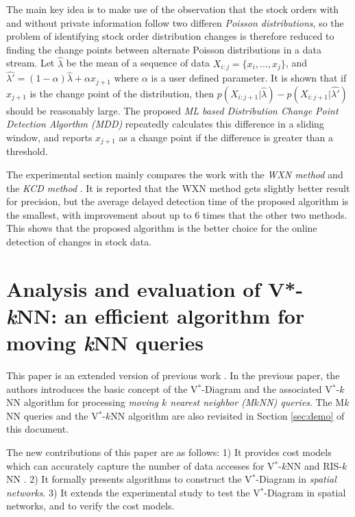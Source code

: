 \documentclass[paper=a4, fontsize=18pt]{article} %
\numberwithin{equation}{section} %
\numberwithin{figure}{section} %
\numberwithin{table}{section} %
\begin{document}
The main key idea is to make use of the observation that the stock orders with and without private information follow two differen \emph{Poisson distributions}, so the problem of identifying stock order distribution changes is therefore reduced to finding the change points between alternate Poisson distributions in a data stream. Let $\hat{\lambda}$ be the mean of a sequence of data $X_{i:j} = \{x_i,...,x_j\}$, and $\hat{\lambda'} = (1-\alpha)\hat{\lambda} + \alpha x_{j+1}$ where $\alpha$ is a user defined parameter. It is shown that if $x_{j+1}$ is the change point of the distribution, then $p(X_{i:j+1} | \hat{\lambda}) - p(X_{i:j+1} | \hat{\lambda'})$ should be reasonably large. The proposed \emph{ML based Distribution Change Point Detection Algorthm (MDD)} repeatedly calculates this difference in a sliding window, and reports $x_{j+1}$ as a change point if the difference is greater than a threshold.

The experimental section mainly compares the work with the \emph{WXN method} \cite{KBG04} and the \emph{KCD method} \cite{DDD05}. It is reported that the WXN method gets slightly better result for precision, but the average delayed detection time of the proposed algorithm is the smallest, with improvement about up to 6 times that the other two methods. This shows that the proposed algorithm is the better choice for the online detection of changes in stock data.

\section{Analysis and evaluation of V*-\emph{k}NN: an efficient algorithm for moving \emph{k}NN queries \cite{NZTK10}}

This paper is an extended version of previous work \cite{AZTK08}. In the previous paper, the authors introduces the basic concept of the V$^*$-Diagram and the associated V$^*$-$k$NN algorithm for processing \emph{moving $k$ nearest neighbor (M$k$NN) queries}. The M$k$NN queries and the V$^*$-$k$NN algorithm are also revisited in Section \ref{sec:demo} of this document.

The new contributions of this paper are as follows: 1) It provides cost models which can accurately capture the number of data accesses for V$^*$-$k$NN and RIS-$k$NN \cite{ZZPTL03}. 2) It formally presents algorithms to construct the V$^*$-Diagram in \emph{spatial networks}. 3) It extends the experimental study to test the V$^*$-Diagram in spatial networks, and to verify the cost models.
\end{document}
